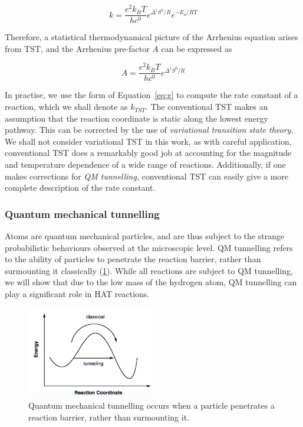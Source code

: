 \begin{equation}
  k = \frac{e^2k_B T}{hc^0}e^{\Delta^\ddagger S^0/R}e^{-E_a/RT}
\end{equation}

Therefore, a statistical thermodynamical picture of the Arrhenius equation arises from TST, and the Arrhenius pre-factor $A$ can be expressed as

\begin{equation}
  A = \frac{e^2k_B T}{hc^0}e^{\Delta^\ddagger S^0/R}
\label{eq:afactor}
\end{equation}

In practise, we use the form of Equation~\ref{eq:g} to compute the rate constant of a reaction, which we shall denote as $k_{TST}$. The conventional TST makes an assumption that the reaction coordinate is static along the lowest energy pathway. This can be corrected by the use of \emph{variational transition state theory}.\cite{Truhlar1984} We shall not consider variational TST in this work, as with careful application, conventional TST does a remarkably good job at accounting for the magnitude and temperature dependence of a wide range of reactions.\cite{Steinfeld1998} Additionally, if one makes corrections for \emph{QM tunnelling}, conventional TST can easily give a more complete description of the rate constant.

\subsubsection{Quantum mechanical tunnelling}

Atoms are quantum mechanical particles, and are thus subject to the strange probabilistic behaviours observed at the microscopic level. QM tunnelling refers to the ability of particles to penetrate the reaction barrier, rather than surmounting it classically (\ref{fig:tunnelling}). While all reactions are subject to QM tunnelling, we will show that due to the low mass of the hydrogen atom, QM tunnelling can play a significant role in HAT reactions.

\begin{figure}[htb]
  \centering
  \includegraphics[width=0.5\textwidth]{figures/tunnelling-1}
  \caption{Quantum mechanical tunnelling occurs when a particle penetrates a
    reaction barrier, rather than surmounting it.}
\label{fig:tunnelling}
\end{figure}


